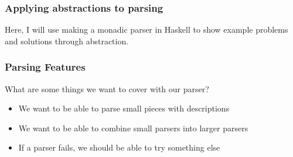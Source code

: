 \documentclass{beamer}
\begin{document}


\begin{frame}
  \frametitle{Applying abstractions to parsing}

  Here, I will use making a monadic parser in Haskell 
  to show example problems and solutions through abstraction.
\end{frame}


\begin{frame}
  \frametitle{Parsing Features}

  What are some things we want to cover with our parser?
  \begin{itemize}
    \item We want to be able to parse small pieces with descriptions
    \item We want to be able to combine small parsers into larger parsers
    \item If a parser fails, we should be able to try something else
  \end{itemize}

\end{frame}
\end{document}
